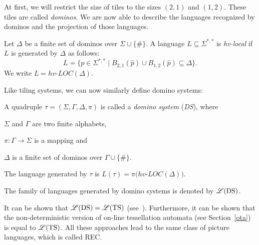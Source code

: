 At first, we will restrict the size of tiles to the sizes $(2, 1)$ and $(1, 2)$. These tiles are
called \emph{dominos}. We are now able to describe the languages recognized by dominos and the
projection of those languages.
\begin{definition}
	Let $\Delta$ be a finite set of dominos over $\Sigma \cup \{\#\}$. A language $L \subseteq
	\Sigma^{*, *}$ is \emph{hv-local} if $L$ is generated by $\Delta$ as follows: 
	\[L = \{p \in \Sigma^{*, *} \mid B_{2, 1}(\hat{p}) \cup B_{1, 2}(\hat{p}) \subseteq \Delta\}.\]
	We write $L = hv$-$LOC(\Delta)$. 
\end{definition}

% 
% 	
Like tiling systems, we can now similarly define domino systems:
\newpage
\begin{definition}
	A quadruple $\tau = (\Sigma, \Gamma, \Delta, \pi)$ is called a \emph{domino system} (\emph{DS}),
	where
	\begin{compactitem}
		\item $\Sigma$ and $\Gamma$ are two finite alphabets,
		\item $\pi: \Gamma \rightarrow \Sigma$ is a mapping and
		\item $\Delta$ is a finite set of dominos over $\Gamma\cup\{\#\}$.
	\end{compactitem}
	The language generated by $\tau$ is $L(\tau) = \pi(hv$-$LOC(\Delta))$. 
\end{definition}

The family of languages generated by domino systems is denoted by $\mathscr{L}(\text{DS})$. 

It can be shown that $\mathscr{L}(\text{DS}) = \mathscr{L}(\text{TS})$ (see~\cite{giammarresi1997twodimensional}).
Furthermore, it can be shown that the non-deterministic version of on-line tessellation automata
(see Section~\ref{ota}) is equal to $\mathscr{L}(\text{TS})$. All these approaches lead to the same class of
picture languages, which is called REC.
\label{domino_systems}